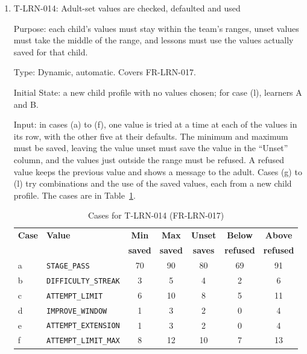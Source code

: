 \documentclass[12pt, titlepage]{article}
\newcommand{\testitem}[1]{\item #1\par\nopagebreak}
\begin{document}
\begin{enumerate}
Output: the expected output of each case is in its row of
Table~\ref{tab:t-lrn-013}; the test passes when every case gives it.

Test Case Derivation: the fit criterion, before the limit and at it. (b)
is the last attempt before \texttt{ATTEMPT\_LIMIT}, and (c) reaches it (SRS
Section~9.2, ``End at limit''). In (d), an incomplete attempt is still a
non-passing attempt.

How test will be performed: Vitest for every case; Playwright end to end
for (a) and (c) with \texttt{circle-\allowbreak{}fail.json}.

\testitem{T-LRN-014: Adult-set values are checked, defaulted and used}

Purpose: each child's values must stay within the team's ranges, unset
values must take the middle of the range, and lessons must use the values
actually saved for that child.

Type: Dynamic, automatic. Covers FR-LRN-017.

Initial State: a new child profile with no values chosen; for case (l),
learners A and B.

Input: in cases (a) to (f), one value is tried at a time at each of the
values in its row, with the other five at their defaults. The minimum and
maximum must be saved, leaving the value unset must save the value in the
``Unset'' column, and the values just outside the range must be refused. A
refused value keeps the previous value and shows a message to the adult.
Cases (g) to (l) try combinations and the use of the saved values, each
from a new child profile. The cases are in Table~\ref{tab:t-lrn-014}.

\begin{table}[htbp]
\centering\small
\caption{Cases for T-LRN-014 (FR-LRN-017)}
\label{tab:t-lrn-014}
\setlength{\tabcolsep}{4pt}
\begin{tabular}{@{}l l c c c c c@{}}
\toprule
\textbf{Case} & \textbf{Value} & \textbf{Min} & \textbf{Max} &
\textbf{Unset} & \textbf{Below} & \textbf{Above}\\
 & & \textbf{saved} & \textbf{saved} & \textbf{saves} & \textbf{refused} &
\textbf{refused}\\
\midrule
a & \texttt{STAGE\_PASS} & 70 & 90 & 80 & 69 & 91\\
b & \texttt{DIFFICULTY\_STREAK} & 3 & 5 & 4 & 2 & 6\\
c & \texttt{ATTEMPT\_LIMIT} & 6 & 10 & 8 & 5 & 11\\
d & \texttt{IMPROVE\_WINDOW} & 1 & 3 & 2 & 0 & 4\\
e & \texttt{ATTEMPT\_EXTENSION} & 1 & 3 & 2 & 0 & 4\\
f & \texttt{ATTEMPT\_LIMIT\_MAX} & 8 & 12 & 10 & 7 & 13\\
\bottomrule
\end{tabular}


\end{table}
\end{enumerate}
\end{document}
